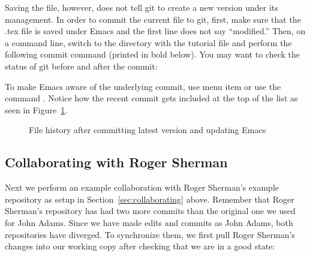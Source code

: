 Saving the file, however, does not tell git to create a new version under its management.  In order to commit the current file to git, first, make sure that the .tex file is saved under Emacs and the first line does not say ``modified.'' Then, on a command line, switch to the directory with the tutorial file and perform the following commit command (printed in bold below).  You may want to check the status of git before and after the commit:

To make Emacs aware of the underlying commit, use menu item  or use the command .  Notice how the recent commit gets included at the top of the list as seen in Figure~\ref{fig:emacs-new-commit}.

\begin{figure}
\centering
{}
\caption{File history after committing latest version and updating Emacs} \label{fig:emacs-new-commit}
\end{figure}

\subsection{Collaborating with Roger Sherman} \label{sec:tutorial-git-emacs:collab}

Next we perform an example collaboration with Roger Sherman's example repository as setup in Section~\ref{sec:collaborating} above.  Remember that Roger Sherman's repository has had two more commits than the original one we used for John Adams.  Since we have made edits and commits as John Adams, both repositories have diverged.  To synchronize them, we first pull Roger Sherman's changes into our working copy after checking that we are in a good state:

